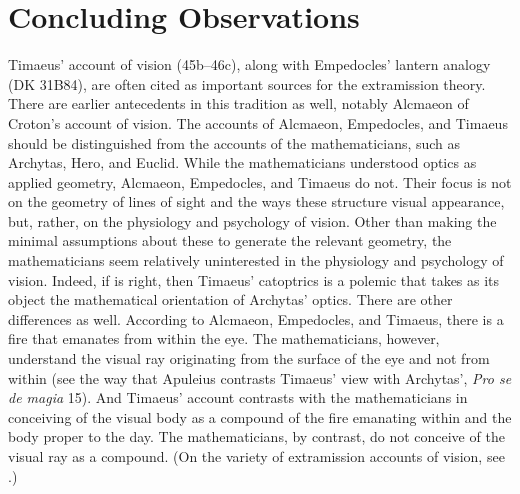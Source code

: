 
\section{Concluding Observations} %
\label{sec:concluding_observations_v_a}

Timaeus' account of vision (45b–46c), along with Empedocles' lantern analogy (DK 31B84), are often cited as important sources for the extramission theory. There are earlier antecedents in this tradition as well, notably Alcmaeon of Croton's account of vision. The accounts of Alcmaeon, Empedocles, and Timaeus should be distinguished from the accounts of the mathematicians, such as Archytas, Hero, and Euclid. While the mathematicians understood optics as applied geometry, Alcmaeon, Empedocles, and Timaeus do not. Their focus is not on the geometry of lines of sight and the ways these structure visual appearance, but, rather, on the physiology and psychology of vision. Other than making the minimal assumptions about these to generate the relevant geometry, the mathematicians seem relatively uninterested in the physiology and psychology of vision. Indeed, if \citet{Burnyeat:2005rc} is right, then Timaeus' catoptrics is a polemic that takes as its object the mathematical orientation of Archytas' optics. There are other differences as well. According to Alcmaeon, Empedocles, and Timaeus, there is a fire that emanates from within the eye. The mathematicians, however, understand the visual ray originating from the surface of the eye and not from within (see the way that Apuleius contrasts Timaeus' view with Archytas', \emph{Pro se de magia} 15). And Timaeus' account contrasts with the mathematicians in conceiving of the visual body as a compound of the fire emanating within and the body proper to the day. The mathematicians, by contrast, do not conceive of the visual ray as a compound. (On the variety of extramission accounts of vision, see \citealt{Lindberg:1978lq}.)

